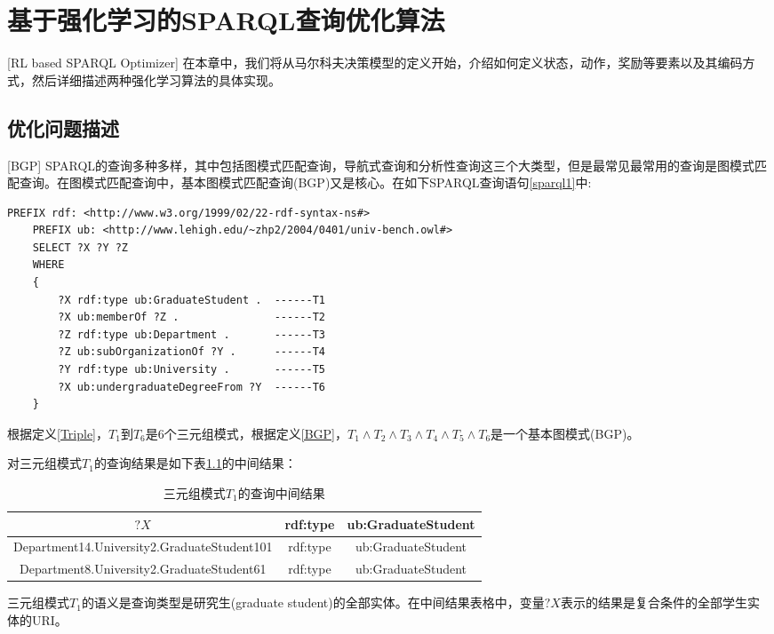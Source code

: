 \chapter{基于强化学习的SPARQL查询优化算法}[RL based SPARQL Optimizer]
在本章中，我们将从马尔科夫决策模型的定义开始，介绍如何定义状态，动作，奖励等要素以及其编码方式，然后详细描述两种强化学习算法的具体实现。

\section{优化问题描述}[BGP]
SPARQL的查询多种多样，其中包括图模式匹配查询，导航式查询和分析性查询这三个大类型，但是最常见最常用的查询是图模式匹配查询。在图模式匹配查询中，基本图模式匹配查询(BGP)又是核心。在如下SPARQL查询语句\ref{sparql1}中:
\begin{lstlisting}[caption={SPARQL查询语句},label={sparql1}]
    PREFIX rdf: <http://www.w3.org/1999/02/22-rdf-syntax-ns#>
    PREFIX ub: <http://www.lehigh.edu/~zhp2/2004/0401/univ-bench.owl#>
    SELECT ?X ?Y ?Z
    WHERE
    {
        ?X rdf:type ub:GraduateStudent .  ------T1
        ?X ub:memberOf ?Z .               ------T2
        ?Z rdf:type ub:Department .       ------T3
        ?Z ub:subOrganizationOf ?Y .      ------T4
        ?Y rdf:type ub:University .       ------T5        
        ?X ub:undergraduateDegreeFrom ?Y  ------T6
    }
\end{lstlisting}
根据定义\ref{Triple}，$T_1$到$T_6$是6个三元组模式，根据定义\ref{BGP}，$T_1\wedge T_2\wedge T_3\wedge T_4\wedge T_5\wedge T_6$是一个基本图模式(BGP)。

对三元组模式$T_1$的查询结果是如下表\ref{T1}的中间结果：
\begin{table}[htbp]
    \caption[table1]{三元组模式$T_1$的查询中间结果}
    \label{T1}
    \vspace{0.5em}\centering\wuhao
    \begin{tabular}{|c|c|c|}
    \toprule[1.5pt]
    $?X$ & rdf:type & ub:GraduateStudent\\
    \midrule[1pt]
    Department14.University2.GraduateStudent101 & rdf:type & ub:GraduateStudent\\
    Department8.University2.GraduateStudent61 & rdf:type &ub:GraduateStudent\\
    \bottomrule[1.5pt]
    \end{tabular}
\end{table}
三元组模式$T_1$的语义是查询类型是研究生(graduate student)的全部实体。在中间结果表格中，变量$?X$表示的结果是复合条件的全部学生实体的URI。


